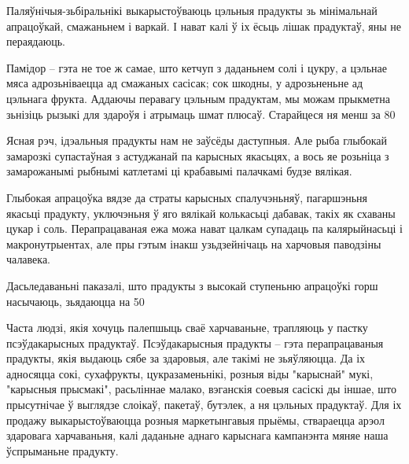 Паляўнічыя-зьбіральнікі выкарыстоўваюць цэльныя прадукты зь мінімальнай апрацоўкай, смажаньнем і варкай. І нават калі ў іх ёсьць лішак прадуктаў, яны не пераядаюць.

Памідор – гэта не тое ж самае, што кетчуп з даданьнем солі і цукру, а цэльнае мяса адрозьніваецца ад смажаных сасісак; сок шкодны, у адрозьненьне ад цэльнага фрукта. Аддаючы перавагу цэльным прадуктам, мы можам прыкметна зьнізіць рызыкі для здароўя і атрымаць шмат плюсаў. Старайцеся ня менш за 80%

Ясная рэч, ідэальныя прадукты нам не заўсёды даступныя. Але рыба глыбокай замарозкі супастаўная з астуджанай па карысных якасьцях, а вось яе розьніца з замарожанымі рыбнымі катлетамі ці крабавымі палачкамі будзе вялікая.

Глыбокая апрацоўка вядзе да страты карысных спалучэньняў, пагаршэньня якасьці прадукту, уключэньня ў яго вялікай колькасьці дабавак, такіх як схаваны цукар і соль. Перапрацаваная ежа можа нават цалкам супадаць па калярыйнасьці і макронутрыентах, але пры гэтым інакш узьдзейнічаць на харчовыя паводзіны чалавека.

Дасьледаваньні паказалі, што прадукты з высокай ступеньню апрацоўкі горш насычаюць, зьядаюцца на 50%

Часта людзі, якія хочуць палепшыць сваё харчаваньне, трапляюць у пастку псэўдакарысных прадуктаў. Псэўдакарысныя прадукты – гэта перапрацаваныя прадукты, якія выдаюць сябе за здаровыя, але такімі не зьяўляюцца. Да іх адносяцца сокі, сухафрукты, цукразаменьнікі, розныя віды "карыснай" мукі, "карысныя прысмакі", расьліннае малако, вэганскія соевыя сасіскі ды іншае, што прысутнічае ў выглядзе слоікаў, пакетаў, бутэлек, а ня цэльных прадуктаў. Для іх продажу выкарыстоўваюцца розныя маркетынгавыя прыёмы, ствараецца арэол здаровага харчаваньня, калі даданьне аднаго карыснага кампанэнта мяняе наша ўспрыманьне прадукту.


